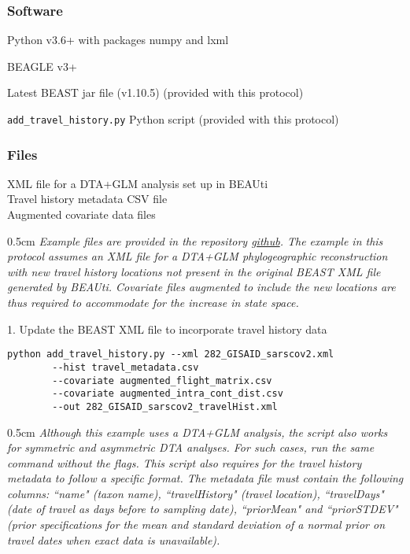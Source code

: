 \documentclass{article}
\newcommand{\ann}[1]{
\begin{adjustwidth}{0.5cm}{}
\it{#1}\\
\end{adjustwidth}}
\newcommand{\code}[1]{
{\upshape\ttfamily{#1}}}
\begin{document}
\subsubsection*{Software}
\hspace{0.5cm}Python v3.6+ with packages numpy and lxml

\hspace{0.5cm}BEAGLE v3+

\hspace{0.5cm}Latest BEAST jar file (v1.10.5) (provided with this protocol)

\hspace{0.5cm}\verb|add_travel_history.py| Python script (provided with this protocol)

\subsubsection*{Files}
XML file for a DTA+GLM analysis set up in BEAUti \\
Travel history metadata CSV file \\
Augmented covariate data files \\

\ann{Example files are provided in the repository {\upshape\url{github}}. %
The example in this protocol assumes an XML file for a DTA+GLM phylogeographic reconstruction with new travel history locations not present in the original BEAST XML file generated by BEAUti.
Covariate files augmented to include the new locations are thus required to accommodate for the increase in state space.}

1. Update the BEAST XML file to incorporate travel history data
\begin{verbatim}
python add_travel_history.py --xml 282_GISAID_sarscov2.xml
        --hist travel_metadata.csv
        --covariate augmented_flight_matrix.csv
        --covariate augmented_intra_cont_dist.csv
        --out 282_GISAID_sarscov2_travelHist.xml
\end{verbatim}

\ann{Although this example uses a DTA+GLM analysis, the\code{add\_travel\_history.py} script also works for symmetric and asymmetric DTA analyses. For such cases, run the same command without the\code{--covariate} flags. This script also requires for the travel history metadata to follow a specific format.
The metadata file must contain the following columns: ``name"  (taxon name), ``travelHistory"  (travel location), ``travelDays"  (date of travel as days before to sampling date), ``priorMean"  and ``priorSTDEV"  %
(prior specifications for the mean and standard deviation of a normal prior on travel dates when exact data is unavailable).}
\end{document}

